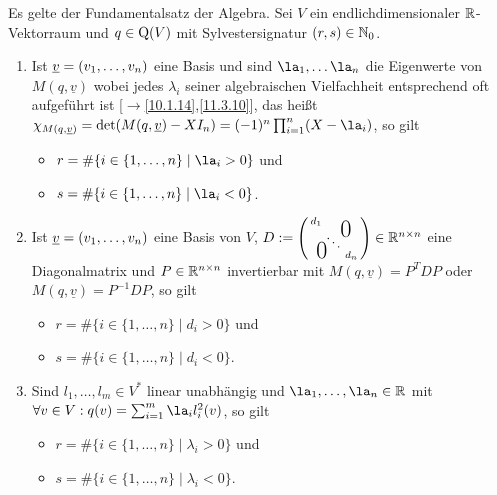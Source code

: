 \documentclass[../../main.tex]{subfiles}
\begin{document}
\begin{sat}\label{14.1.2}
Es gelte der Fundamentalsatz der Algebra. Sei $V$ ein endlichdimensionaler $\mathbb R$-Vektorraum und $q\in \operatorname{Q}(V)$ mit Sylvestersignatur $(r,s)\in \mathbb N_0$.
\begin{enumerate}[\normalfont(a)]
\item Ist ${\underline v}=(v_1,\ldots ,v_n)$ eine Basis und sind $\la_1,\ldots \la_n$ die Eigenwerte von $M(q,\underline{v})$ wobei jedes $\lambda_i$ seiner algebraischen Vielfachheit entsprechend oft aufgeführt ist [$\to$\ref{10.1.14},\ref{11.3.10}], das heißt $\chi_{M(q,\underline{v})}=\det(M(q,\v)-XI_n)=(-1)^n\prod_{i=1}^n(X - \la_i)$, so gilt
\begin{itemize}
\item $r=\#\{i\in \{1,\ldots ,n\}\mid \la_i>0\}$ und
\item $s=\#\{i\in \{1,\ldots ,n\}\mid \la_i<0\}$.
\end{itemize}
\item Ist ${\underline v}=(v_1,\ldots ,v_n)$ eine Basis von $V$, $D:=\left(\begin{smallmatrix}
d_1 & & \llap{$\overset{\blap{\LARGE 0}}{~}$} \\
& \ddots &\\
\rlap{\tlap{\LARGE 0}} & & d_n\end{smallmatrix}\right)\in \R^{n\times n}$ eine Diagonalmatrix und $P\in \mathbb R^{n\times n}$ invertierbar mit $M(q,\underline{v})=P^TDP$ oder $M(q,\underline{v})=P^{-1}DP$, so gilt
\begin{itemize}
\item $r=\#\{i\in \{1,\ldots ,n\}\mid d_i>0\}$ und
\item $s=\#\{i\in \{1,\ldots ,n\}\mid d_i<0\}$.
\end{itemize}
\item Sind $l_1,\ldots ,l_m\in V^*$ linear unabhängig und $\la_1,\ldots ,\la_n\in \R$ mit $\forall v\in V: q(v)=\sum_{i=1}^m\la_il_i^2(v)$, so gilt
\begin{itemize}
\item $r=\#\{i\in \{1,\ldots ,n\}\mid \lambda_i>0\}$ und
\item $s=\#\{i\in \{1,\ldots ,n\}\mid \lambda_i<0\}$.
\end{itemize}
\end{enumerate}
\end{sat}
\end{document}
